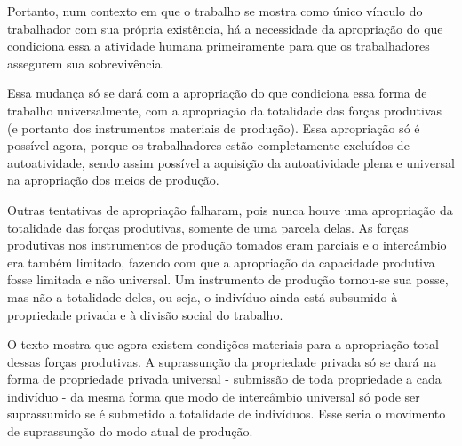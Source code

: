 \documentclass[12pt]{article}
\begin{document}
Portanto, num contexto em que o trabalho se mostra como único vínculo do trabalhador com sua própria existência, há a necessidade da apropriação do que condiciona essa a atividade humana primeiramente para que os trabalhadores assegurem sua sobrevivência.

Essa mudança só se dará com a apropriação do que condiciona essa forma de trabalho universalmente, com a apropriação da totalidade das forças produtivas (e portanto dos instrumentos materiais de produção).
Essa apropriação só é possível agora, porque os trabalhadores estão completamente excluídos de autoatividade, sendo assim possível a aquisição da autoatividade plena e universal na apropriação dos meios de produção.

Outras tentativas de apropriação falharam, pois nunca houve uma apropriação da totalidade das forças produtivas, somente de uma parcela delas.
As forças produtivas nos instrumentos de produção tomados eram parciais e o intercâmbio era também limitado, fazendo com que a apropriação da capacidade produtiva fosse limitada e não universal. Um instrumento de produção tornou-se sua posse, mas não a totalidade deles, ou seja, o indivíduo ainda está subsumido à propriedade privada e à divisão social do trabalho.

O texto mostra que agora existem condições materiais para a apropriação total dessas forças produtivas. A suprassunção da propriedade privada só se dará na forma de propriedade privada universal - submissão de toda propriedade a cada indivíduo - da mesma forma que modo de intercâmbio universal só pode ser suprassumido se é submetido a totalidade de indivíduos. Esse seria o movimento de suprassunção do modo atual de produção.
\end{document}
